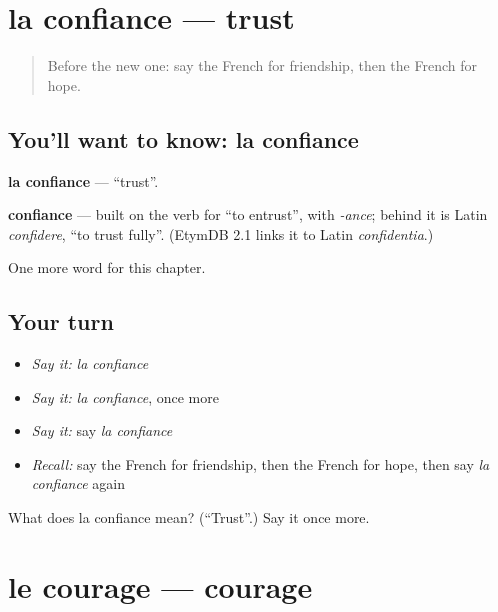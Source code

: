 \section[la confiance]{la confiance — trust}

\label{lesson:FR-C186-confiance}



\begin{quote}
Before the new one: say the French for friendship, then the French for hope.
\end{quote}

\subsection*{You'll want to know: la confiance}
\textbf{la confiance} — \textquotedblleft{}trust\textquotedblright{}.

\begin{cousinweb}
\textbf{confiance} — built on the verb for \textquotedblleft{}to entrust\textquotedblright{}, with \emph{-ance}; behind it is Latin \emph{confidere}, \textquotedblleft{}to trust fully\textquotedblright{}. (EtymDB 2.1 links it to Latin \emph{confidentia}.)
\end{cousinweb}

\begin{grammarlens}[title={What you've built}]
One more word for this chapter.
\end{grammarlens}

\subsection*{Your turn}
\begin{itemize}
\raggedright
  \item \emph{Say it:} \emph{la confiance}
  \item \emph{Say it:} \emph{la confiance}, once more
  \item \emph{Say it:} say \emph{la confiance}
  \item \emph{Recall:} say the French for friendship, then the French for hope, then say \emph{la confiance} again
\end{itemize}

\begin{tcolorbox}[breakable,colback=teal!4,colframe=teal!35!black,title={Before you move on}]
What does la confiance mean? (\textquotedblleft{}Trust\textquotedblright{}.) Say it once more.
\end{tcolorbox}
\section[le courage]{le courage — courage}

